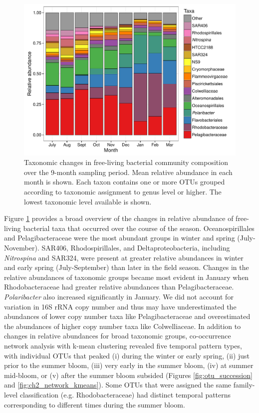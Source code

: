 \begin{figure}[ht!] 
\centering 
\includegraphics[width=\textwidth]{Chapter_3_SWI/Figures/Figure_2_taxa_barplot} 
\caption[Taxonomic changes in bacterial community composition over the nine-month time series.]{Taxonomic changes in free-living bacterial community composition over the 9-month sampling period. Mean relative abundance in each month is shown. Each taxon contains one or more OTUs grouped according to taxonomic assignment to genus level or higher. The lowest taxonomic level available is shown.} 
\label{fig:taxa_barplot} 
\end{figure}

Figure \ref{fig:taxa_barplot} provides a broad overview of the changes in relative abundance of free-living bacterial taxa that occurred over the course of the season. Oceanospirillales and Pelagibacteraceae were the most abundant groups in winter and spring (July-November). SAR406, Rhodospirillales, and Deltaproteobacteria, including \textit{Nitrospina} and SAR324, were present at greater relative abundances in winter and early spring (July-September) than later in the field season. Changes in the relative abundances of taxonomic groups became most evident in January when Rhodobacteraceae had greater relative abundances than Pelagibacteraceae. \textit{Polaribacter} also increased significantly in January. We did not account for variation in 16S rRNA copy number and thus may have underestimated the abundances of lower copy number taxa like Pelagibacteraceae and overestimated the abundances of higher copy number taxa like Colwelliaceae. In addition to changes in relative abundances for broad taxonomic groups, co-occurrence network analysis with k-mean clustering revealed five temporal pattern types, with individual OTUs that peaked (i) during the winter or early spring, (ii) just prior to the summer bloom, (iii) very early in the summer bloom, (iv) at summer mid-bloom, or (v) after the summer bloom subsided (Figures \ref{fig:otu_succession} and \ref{fig:ch2_network_kmeans}). Some OTUs that were assigned the same family-level classification (e.g. Rhodobacteraceae) had distinct temporal patterns corresponding to different times during the summer bloom. 


